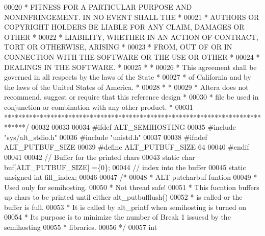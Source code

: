 \begin{DoxyCode}
00020 \textcolor{comment}{* FITNESS FOR A PARTICULAR PURPOSE AND NONINFRINGEMENT. IN NO EVENT SHALL THE *}
00021 \textcolor{comment}{* AUTHORS OR COPYRIGHT HOLDERS BE LIABLE FOR ANY CLAIM, DAMAGES OR OTHER      *}
00022 \textcolor{comment}{* LIABILITY, WHETHER IN AN ACTION OF CONTRACT, TORT OR OTHERWISE, ARISING     *}
00023 \textcolor{comment}{* FROM, OUT OF OR IN CONNECTION WITH THE SOFTWARE OR THE USE OR OTHER         *}
00024 \textcolor{comment}{* DEALINGS IN THE SOFTWARE.                                                   *}
00025 \textcolor{comment}{*                                                                             *}
00026 \textcolor{comment}{* This agreement shall be governed in all respects by the laws of the State   *}
00027 \textcolor{comment}{* of California and by the laws of the United States of America.              *}
00028 \textcolor{comment}{*                                                                             *}
00029 \textcolor{comment}{* Altera does not recommend, suggest or require that this reference design    *}
00030 \textcolor{comment}{* file be used in conjunction or combination with any other product.          *}
00031 \textcolor{comment}{******************************************************************************/}
00032 
00033 
00034 \textcolor{preprocessor}{#ifdef ALT\_SEMIHOSTING}
00035 \textcolor{preprocessor}{#include "sys/alt_stdio.h"}
00036 \textcolor{preprocessor}{#include "unistd.h"}
00037 
00038 \textcolor{preprocessor}{#ifndef ALT\_PUTBUF\_SIZE}
00039 \textcolor{preprocessor}{#define ALT\_PUTBUF\_SIZE 64}
00040 \textcolor{preprocessor}{#endif}
00041 
00042 \textcolor{comment}{// Buffer for the printed chars}
00043 \textcolor{keyword}{static} \textcolor{keywordtype}{char} buf[ALT\_PUTBUF\_SIZE] =\{0\};
00044 \textcolor{comment}{// index into the buffer}
00045 \textcolor{keyword}{static} \textcolor{keywordtype}{unsigned} \textcolor{keywordtype}{int} fill\_index;
00046 
00047 \textcolor{comment}{/* }
00048 \textcolor{comment}{ * ALT putcharbuf funtion}
00049 \textcolor{comment}{ * Used only for semihosting. }
00050 \textcolor{comment}{ * Not thread safe!}
00051 \textcolor{comment}{ * This fucntion buffers up chars to be printed until either alt\_putbufflush()}
00052 \textcolor{comment}{ * is called or the buffer is full.}
00053 \textcolor{comment}{ * It is called by alt\_printf when semihosting is turned on}
00054 \textcolor{comment}{ * Its purpose is to minimize the number of Break 1 issuesd by the semihosting}
00055 \textcolor{comment}{ * libraries. }
00056 \textcolor{comment}{ */}
00057 \textcolor{keywordtype}{int} 

\end{DoxyCode}
